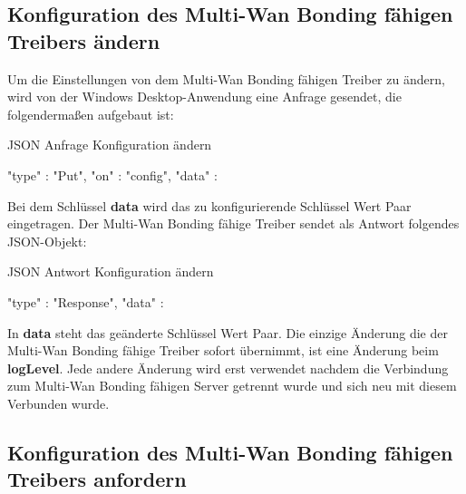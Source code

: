 \subsection{Konfiguration des Multi-Wan Bonding fähigen Treibers ändern}
Um die Einstellungen von dem Multi-Wan Bonding fähigen Treiber zu ändern, wird von der Windows Desktop-Anwendung eine Anfrage gesendet, die folgendermaßen aufgebaut ist:
\begin{program}[H]
\caption{JSON Anfrage Konfiguration ändern}
\begin{GenericCode}
    {
        "type" :  "Put",
        "on" :  "config",
        "data" : {} 
    }     
\end{GenericCode}
\end{program}
\noindent
Bei dem Schlüssel \textbf{data} wird das zu konfigurierende Schlüssel Wert Paar eingetragen. Der Multi-Wan Bonding fähige Treiber sendet als Antwort folgendes JSON-Objekt:
\begin{program}[H]
\caption{JSON Antwort Konfiguration ändern}
\begin{GenericCode}
    {
        "type" :  "Response",
        "data" : {} 
    }    
\end{GenericCode}
\end{program}
\noindent
In \textbf{data} steht das geänderte Schlüssel Wert Paar. Die einzige Änderung die der Multi-Wan Bonding fähige Treiber sofort übernimmt, ist eine Änderung beim \textbf{logLevel}. Jede andere Änderung wird erst verwendet nachdem die Verbindung zum Multi-Wan Bonding fähigen Server getrennt wurde und sich neu mit diesem Verbunden wurde.


\subsection{Konfiguration des Multi-Wan Bonding fähigen Treibers anfordern}

